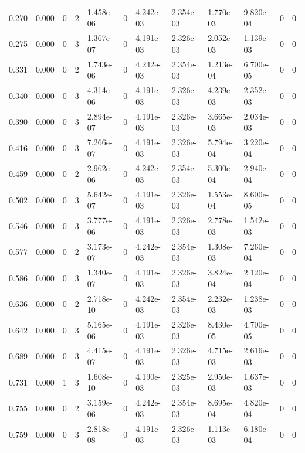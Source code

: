 \documentclass[preview]{standalone}
\begin{document}
{{\begin{tabular}{L{1.2cm}C{1.2cm} C{0.3cm}C{0.5cm} C{1.4cm}C{1.4cm} C{1.4cm}C{1.4cm} C{1.6cm}C{1.6cm} C{1.6cm}C{1.6cm}}
  0.270  &  0.000  & 0     &  2 &  1.458e-06  & 0  &  4.242e-03&   2.354e-03& 1.770e-03 & 9.820e-04   &  0 & 0  \\ 
  0.275  &  0.000  & 0     &  3 &  1.367e-07  & 0  &  4.191e-03&   2.326e-03& 2.052e-03 & 1.139e-03   &  0 & 0  \\ 
  0.331  &  0.000  & 0     &  2 &  1.743e-06  & 0  &  4.242e-03&   2.354e-03& 1.213e-04 & 6.700e-05   &  0 & 0  \\ 
  0.340  &  0.000  & 0     &  3 &  4.314e-06  & 0  &  4.191e-03&   2.326e-03& 4.239e-03 & 2.352e-03   &  0 & 0  \\ 
  0.390  &  0.000  & 0     &  3 &  2.894e-07  & 0  &  4.191e-03&   2.326e-03& 3.665e-03 & 2.034e-03   &  0 & 0  \\ 
  0.416  &  0.000  & 0     &  3 &  7.266e-07  & 0  &  4.191e-03&   2.326e-03& 5.794e-04 & 3.220e-04   &  0 & 0  \\ 
  0.459  &  0.000  & 0     &  2 &  2.962e-06  & 0  &  4.242e-03&   2.354e-03& 5.300e-04 & 2.940e-04   &  0 & 0  \\ 
  0.502  &  0.000  & 0     &  3 &  5.642e-07  & 0  &  4.191e-03&   2.326e-03& 1.553e-04 & 8.600e-05   &  0 & 0  \\ 
  0.546  &  0.000  & 0     &  3 &  3.777e-06  & 0  &  4.191e-03&   2.326e-03& 2.778e-03 & 1.542e-03   &  0 & 0  \\ 
  0.577  &  0.000  & 0     &  2 &  3.173e-07  & 0  &  4.242e-03&   2.354e-03& 1.308e-03 & 7.260e-04   &  0 & 0  \\ 
  0.586  &  0.000  & 0     &  3 &  1.340e-07  & 0  &  4.191e-03&   2.326e-03& 3.824e-04 & 2.120e-04   &  0 & 0  \\ 
  0.636  &  0.000  & 0     &  2 &  2.718e-10  & 0  &  4.242e-03&   2.354e-03& 2.232e-03 & 1.238e-03   &  0 & 0  \\ 
  0.642  &  0.000  & 0     &  3 &  5.165e-06  & 0  &  4.191e-03&   2.326e-03& 8.430e-05 & 4.700e-05   &  0 & 0  \\ 
  0.689  &  0.000  & 0     &  3 &  4.415e-07  & 0  &  4.191e-03&   2.326e-03& 4.715e-03 & 2.616e-03   &  0 & 0  \\ 
  0.731  &  0.000  & 1     &  3 &  1.608e-10  & 0  &  4.190e-03&   2.325e-03& 2.950e-03 & 1.637e-03   &  0 & 0  \\ 
  0.755  &  0.000  & 0     &  2 &  3.159e-06  & 0  &  4.242e-03&   2.354e-03& 8.695e-04 & 4.820e-04   &  0 & 0  \\ 
  0.759  &  0.000  & 0     &  3 &  2.818e-08  & 0  &  4.191e-03&   2.326e-03& 1.113e-03 & 6.180e-04   &  0 & 0  \\ 

\end{tabular}}}
\end{document}
